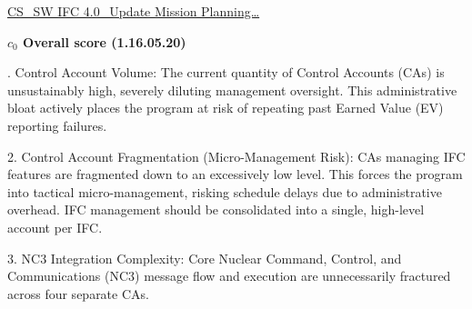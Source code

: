 % 


\begin{frame}{\href{run:../local/source-docs/1.16.05.20.pdf}{CS\_SW IFC 4.0\_Update Mission Planning\ldots{}}}
\centering
{}
\par
\vspace{0.75em}
\textbf{\small{\(c_0\) Overall score {\tiny (1.16.05.20)}}}\\\par
\vspace{0.5em}
\begin{minipage}{0.85\textwidth}
\raggedright
\fontsize{7}{9}. Control Account Volume: The current quantity of Control Accounts (CAs) is unsustainably high, severely diluting management oversight. This administrative bloat actively places the program at risk of repeating past Earned Value (EV) reporting failures.\par\vspace{0.5em}2. Control Account Fragmentation (Micro-Management Risk): CAs managing IFC features are fragmented down to an excessively low level. This forces the program into tactical micro-management, risking schedule delays due to administrative overhead. IFC management should be consolidated into a single, high-level account per IFC.\par\vspace{0.5em}3. NC3 Integration Complexity: Core Nuclear Command, Control, and Communications (NC3) message flow and execution are unnecessarily fractured across four separate CAs.\par
\end{minipage}
\end{frame}
